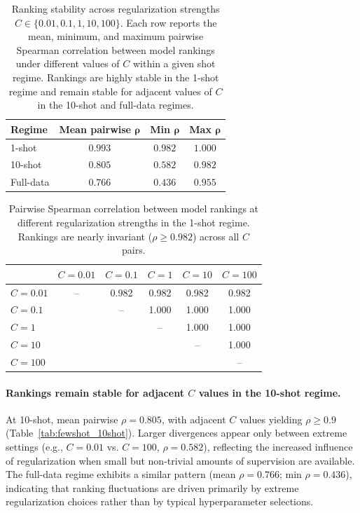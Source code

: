 \documentclass{article}
\theoremstyle{plain}
\theoremstyle{definition}
\theoremstyle{remark}
\begin{document}
\begin{table}[h]
\centering
\caption{Ranking stability across regularization strengths
$C \in \{0.01, 0.1, 1, 10, 100\}$. Each row reports the mean, minimum,
and maximum pairwise Spearman correlation between model rankings under
different values of $C$ within a given shot regime. Rankings are highly
stable in the 1-shot regime and remain stable for adjacent values of
$C$ in the 10-shot and full-data regimes.}
\label{tab:fewshot_summary}
\small
\begin{tabular}{@{}lccc@{}}
\toprule
\textbf{Regime} & \textbf{Mean pairwise} $\boldsymbol{\rho}$ & \textbf{Min} $\boldsymbol{\rho}$ & \textbf{Max} $\boldsymbol{\rho}$ \\
\midrule
1-shot     & $0.993$ & $0.982$ & $1.000$ \\
10-shot    & $0.805$ & $0.582$ & $0.982$ \\
Full-data  & $0.766$ & $0.436$ & $0.955$ \\
\bottomrule
\end{tabular}
\end{table}

\begin{table}[h]
\centering
\caption{Pairwise Spearman correlation between model rankings at
different regularization strengths in the 1-shot regime. Rankings are
nearly invariant ($\rho \geq 0.982$) across all $C$ pairs.}
\label{tab:fewshot_1shot}
\small
\begin{tabular}{@{}lccccc@{}}
\toprule
 & $C=0.01$ & $C=0.1$ & $C=1$ & $C=10$ & $C=100$ \\
\midrule
$C=0.01$  &  --    & 0.982 & 0.982 & 0.982 & 0.982 \\
$C=0.1$   &       &  --    & 1.000 & 1.000 & 1.000 \\
$C=1$     &       &       &  --    & 1.000 & 1.000 \\
$C=10$    &       &       &       &  --    & 1.000 \\
$C=100$   &       &       &       &       &  --    \\
\bottomrule
\end{tabular}
\end{table}

\paragraph{Rankings remain stable for adjacent $C$ values in the 10-shot regime.}
At 10-shot, mean pairwise $\rho = 0.805$, with adjacent $C$ values
yielding $\rho \geq 0.9$ (Table~\ref{tab:fewshot_10shot}). Larger
divergences appear only between extreme settings (e.g., $C = 0.01$ vs.
$C = 100$, $\rho = 0.582$), reflecting the increased influence of
regularization when small but non-trivial amounts of supervision are
available. The full-data regime exhibits a similar pattern (mean
$\rho = 0.766$; min $\rho = 0.436$), indicating that ranking
fluctuations are driven primarily by extreme regularization choices
rather than by typical hyperparameter selections.
\end{document}
